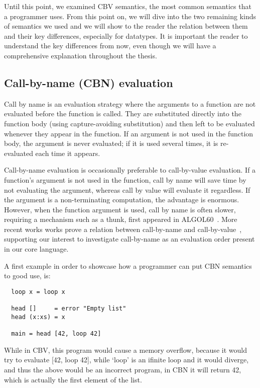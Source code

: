 \documentclass[diploma]{softlab-thesis}
\begin{document}
Until this point, we examined CBV semantics, the most common 
semantics that a programmer uses. From this point on, we will dive into 
the two remaining kinds of semantics we used and we will show to the reader 
the relation between them and their key differences, especially for datatypes.
It is important the reader to understand the key differences from now, even though 
we will have a comprehensive explanation throughout the thesis.

\subsection {Call-by-name (CBN) evaluation}
\label{sec:cbn}

Call by name is an evaluation strategy where the arguments to a function are not evaluated before the function is called. 
They are substituted directly into the function body (using capture-avoiding substitution) and then left to be evaluated 
whenever they appear in the function. If an argument is not used in the function body, the argument is never evaluated; 
if it is used several times, it is re-evaluated each time it appears.

Call-by-name evaluation is occasionally preferable to call-by-value evaluation. If a function's 
argument is not used in the function, call by name will save time by not evaluating the argument, 
whereas call by value will evaluate it regardless. If the argument is a non-terminating computation, 
the advantage is enormous. However, when the function argument is used, call by name is often slower, 
requiring a mechanism such as a thunk, first appeared in ALGOL60~\cite{Naur78}. More recent works 
works prove a relation between call-by-name and call-by-value~\cite{Wadler03}, supporting our interest 
to investigate call-by-name as an evaluation order present in our core language.

A first example in order to showcase how a programmer can put CBN semantics to good use, is:

\begin{verbatim}
  loop x = loop x

  head []     = error "Empty list"
  head (x:xs) = x

  main = head [42, loop 42]
\end{verbatim}

While in CBV, this program would cause a memory overflow, because it would try to evaluate [42, loop 42],
while `loop' is an ifinite loop and it would diverge, and thus the above would be an incorrect program, 
in CBN it will return 42, which is actually the first element of the list.
\end{document}

